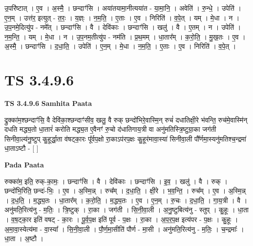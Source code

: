 \documentclass[17pt]{extarticle}
\begin{document}
उ॒परि॑ष्टात् । ए॒व । अ॒स्मै॒ । छन्दाꣳ॑सि । अया॑तयामा॒नीत्यया॑त - या॒मा॒नि॒ । अवेति॑ । रु॒न्धे॒ । उपेति॑ । ए॒न॒म् । उत्त॑र॒ इत्युत् - त॒रः॒ । य॒ज्ञ्ः । न॒म॒ति॒ । ए॒ताः । ए॒व । निरिति॑ । व॒पे॒त् । यम् । मे॒धा । न । उ॒प॒नमे॒दित्यु॑प - नमे᳚त् । छन्दाꣳ॑सि । वै । देवि॑काः । छन्दाꣳ॑सि । खलु॑ । वै । ए॒तम् । न । उपेति॑ । न॒म॒न्ति॒ । यम् । मे॒धा । न । उ॒प॒नम॒तीत्यु॑प - नम॑ति । प्र॒थ॒मम् । धा॒तार᳚म् । क॒रो॒ति॒ । मु॒ख॒तः । ए॒व । अ॒स्मै॒ । छन्दाꣳ॑सि । द॒धा॒ति॒ । उपेति॑ । ए॒न॒म् । मे॒धा । न॒म॒ति॒ । ए॒ताः । ए॒व । निरिति॑ । व॒पे॒त् ।  \newline




\section*{ TS 3.4.9.6 }

\textbf{TS 3.4.9.6 } \newline
\textbf{Samhita Paata} \newline

द्रुक्का॑म॒श्छन्दाꣳ॑सि॒ वै देवि॑का॒श्छन्दाꣳ॑सीव॒ खलु॒ वै रुक् छन्दो॑भिरे॒वास्मि॒न् रुचं॑ दधातिक्षी॒रे भ॑वन्ति॒ रुच॑मे॒वास्मि॑न् दधति मद्ध्य॒तो धा॒तारं॑ करोति मद्ध्य॒त ए॒वैनꣳ॑ रु॒चो द॑धातिगाय॒त्री वा अनु॑मतिस्त्रि॒ष्टुग्रा॒का जग॑ती सिनीवा॒ल्य॑नु॒ष्टुप् कु॒हूर्द्धा॒ता व॑षट्का॒रः पू᳚र्वप॒क्षो रा॒काऽप॑रप॒क्षः कु॒हूर॑मावा॒स्या॑ सिनीवा॒ली पौ᳚र्णमा॒स्यनु॑मतिश्च॒न्द्रमा॑ धा॒ताऽष्टौ - [  ] \newline

\textbf{Pada Paata} \newline

रुक्का॑म॒ इति॒ रुक्-का॒मः॒ । छन्दाꣳ॑सि । वै । देवि॑काः । छन्दाꣳ॑सि । इ॒व॒ । खलु॑ । वै । रुक् । छन्दो॑भि॒रिति॒ छन्दः॑-भिः॒ । ए॒व । अ॒स्मि॒न्न् । रुच᳚म् । द॒धा॒ति॒ । क्षी॒रे । भ॒व॒न्ति॒ । रुच᳚म् । ए॒व । अ॒स्मि॒न्न् । द॒ध॒ति॒ । म॒द्ध्य॒तः । धा॒तार᳚म् । क॒रो॒ति॒ । म॒द्ध्य॒तः । ए॒व । ए॒न॒म् । रु॒चः । द॒धा॒ति॒ । गा॒य॒त्री । वै । अनु॑मति॒रित्य॑नु - म॒तिः॒ । त्रि॒ष्टुक् । रा॒का । जग॑ती । सि॒नी॒वा॒ली । अ॒नु॒ष्टुबित्य॑नु - स्तुप् । कु॒हूः । धा॒ता । व॒ष॒ट्का॒र इति॑ वषट् - का॒रः । पू॒र्व॒प॒क्ष इति॑ पूर्व - प॒क्षः । रा॒का । अ॒प॒र॒प॒क्ष इत्य॑पर - प॒क्षः । कु॒हूः । अ॒मा॒वा॒स्येत्य॑मा - वा॒स्या᳚ । सि॒नी॒वा॒ली । पौ॒र्ण॒मा॒सीति॑ पौर्ण - मा॒सी । अनु॑मति॒रित्य॑नु - म॒तिः॒ । च॒न्द्रमाः᳚ । धा॒ता । अ॒ष्टौ ।  \newline




\end{document}

